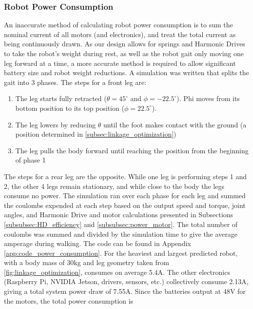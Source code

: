 \subsubsection{Robot Power Consumption} \label{subsubsec:power_simulation}

An inaccurate method of calculating robot power consumption is to sum the nominal current of all motors (and electronics), and treat the total current as being continuously drawn.
As our design allows for springs and Harmonic Drives to take the robot's weight during rest, as well as the robot gait only moving one leg forward at a time, a more accurate method is required to allow significant battery size and robot weight reductions.
A simulation was written that splits the gait into 3 phases.
The steps for a front leg are:

\begin{enumerate}
    \item The leg starts fully retracted ($\theta=45^{\circ}$ and $\phi=-22.5^{\circ}$). Phi moves from its bottom position to its top position ($\phi=22.5^{\circ}$).
    \item The leg lowers by reducing $\theta$ until the foot makes contact with the ground (a position determined in \ref{subsec:linkage_optimization})
    \item The leg pulls the body forward until reaching the position from the beginning of phase 1
\end{enumerate}{}

The steps for a rear leg are the opposite.
While one leg is performing steps 1 and 2, the other 4 legs remain stationary, and while close to the body the legs consume no power.
The simulation ran over each phase for each leg and summed the coulombs expended at each step based on the output speed and torque, joint angles, and Harmonic Drive and motor calculations presented in Subsections \ref{subsubsec:HD_efficiency} and \ref{subsubsec:power_motor}.
The total number of coulombs was summed and divided by the simulation time to give the average amperage during walking.
The code can be found in Appendix \ref{app:code_power_consumption}.
For the heaviest and largest predicted robot, with a body mass of 30kg and leg geometry taken from \ref{fig:linkage_optimization}, consumes on average 5.4A.
The other electronics (Raspberry Pi, NVIDIA Jetson, drivers, sensors, etc.) collectively consume 2.13A, giving a total system power draw of 7.55A.
Since the batteries output at 48V for the motors, the total power consumption is

